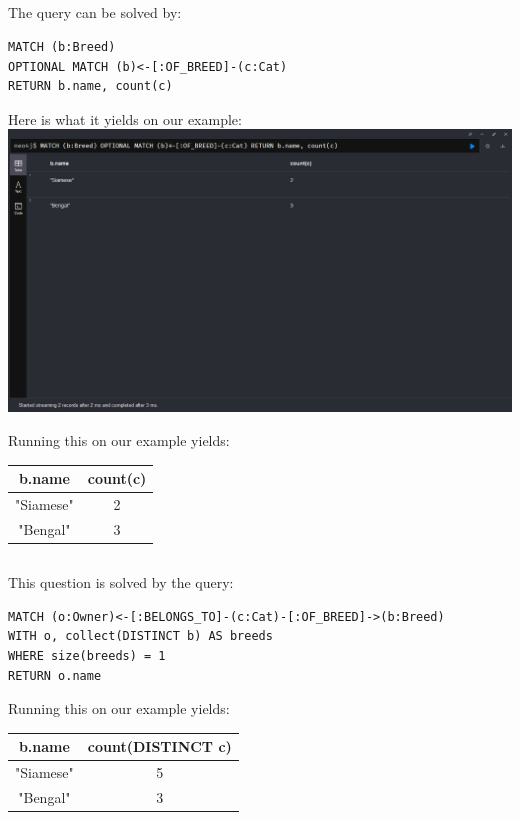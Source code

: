 \documentclass{article}
\begin{document}
\subsection{}
The query can be solved by:
\begin{lstlisting}
MATCH (b:Breed)
OPTIONAL MATCH (b)<-[:OF_BREED]-(c:Cat)
RETURN b.name, count(c)
\end{lstlisting}
Here is what it yields on our example:\\
\includegraphics[width=\textwidth]{kittens2.png}

Running this on our example yields:\\
\begin{center}
\begin{tabular}{|c|c|}
    \hline
    \textbf{b.name} & \textbf{count(c)} \\
    \hline
    "Siamese" & 2 \\
    \hline
    "Bengal" & 3 \\
    \hline
\end{tabular}
\end{center}
  

\subsection{}
This question is solved by the query:
\begin{lstlisting}
MATCH (o:Owner)<-[:BELONGS_TO]-(c:Cat)-[:OF_BREED]->(b:Breed)
WITH o, collect(DISTINCT b) AS breeds
WHERE size(breeds) = 1
RETURN o.name
\end{lstlisting}

Running this on our example yields:\\
\begin{center}
\begin{tabular}{|c|c|}
    \hline
    \textbf{b.name} & \textbf{count(DISTINCT c)} \\
    \hline
    "Siamese" & 5 \\
    \hline
    "Bengal" & 3 \\
    \hline
\end{tabular}
\end{center}
  
\end{document}
